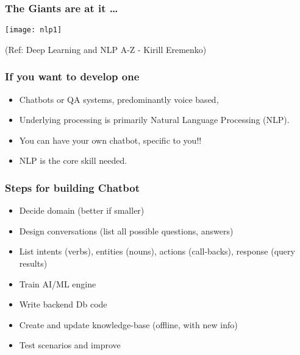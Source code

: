 \begin{frame}[fragile]\frametitle{The Giants are at it \ldots}
\begin{center}
\texttt{[image: nlp1]}

\tiny{(Ref: Deep Learning and NLP A-Z - Kirill Eremenko)}
\end{center}

	
\end{frame}

\begin{frame}[fragile]\frametitle{If you want to develop one}
	\begin{itemize}
	\item Chatbots or QA systems, predominantly voice based, 
	\item Underlying processing is primarily Natural Language Processing (NLP).
	\item You can have your own chatbot, specific to you!! 
	\item NLP is the core skill needed.
	\end{itemize}
	
\end{frame}


\begin{frame}\frametitle{Steps for building Chatbot }
\begin{itemize}
\item Decide domain (better if smaller)
\item Design conversations (list all possible questions, answers)
\item List intents (verbs), entities (nouns), actions (call-backs), response (query results)
\item Train AI/ML engine 
\item Write backend Db code
\item Create and update knowledge-base (offline, with new info)
\item Test scenarios and improve
\end{itemize}
\end{frame}

